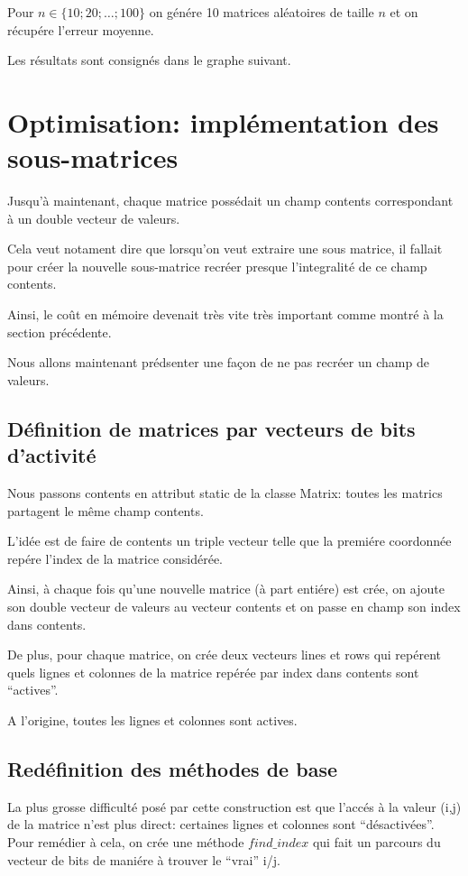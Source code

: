 \documentclass[a4paper,11pt]{article}
\begin{document}
Pour $n \in \{10;20;\dots;100\}$ on génére 10 matrices aléatoires de taille $n$ et on récupére l'erreur moyenne.

Les résultats sont consignés dans le graphe suivant.

\section{Optimisation: implémentation des sous-matrices}


Jusqu'à maintenant, chaque matrice possédait un champ contents correspondant à un double vecteur de valeurs.

Cela veut notament dire que lorsqu'on veut extraire une sous matrice, il fallait pour créer la nouvelle sous-matrice recréer presque l'integralité de ce champ contents.

Ainsi, le coût en mémoire devenait très vite très important comme montré à la section précédente.

Nous allons maintenant prédsenter une façon de ne pas recréer un champ de valeurs.

\subsection{Définition de matrices par vecteurs de bits d'activité}

Nous passons contents en attribut static de la classe Matrix: toutes les matrics partagent le même champ contents.

L'idée est de faire de contents un triple vecteur telle que la premiére coordonnée repére l'index de la matrice considérée. %

Ainsi, à chaque fois qu'une nouvelle matrice (à part entiére) est crée, on ajoute son double vecteur de valeurs au vecteur contents et on passe en champ son index dans contents.

De plus, pour chaque matrice, on crée deux vecteurs lines et rows qui repérent quels lignes et colonnes de la matrice repérée par index dans contents sont ``actives''.

A l'origine, toutes les lignes et colonnes sont actives.

\subsection{Redéfinition des méthodes de base}

La plus grosse difficulté posé par cette construction est que l'accés à la valeur (i,j) de la matrice n'est plus direct: certaines lignes et colonnes sont ``désactivées''. 
Pour remédier à cela, on crée une méthode $find\_index$ qui fait un parcours du vecteur de bits de maniére à trouver le ``vrai'' i/j.
\end{document}
